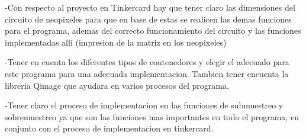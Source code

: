 \documentclass{article}
\begin{document}
-Con respecto al proyecto en Tinkercard hay que tener claro las dimensiones del circuito de neopixeles para que en base de estas se realicen las demas funciones para el programa, ademas del correcto funcionamiento del circuito y las funciones implementadas alli (impresion de la matriz en los neopixeles)

-Tener en cuenta los diferentes tipos de contenedores y elegir el adecuado para este programa para una adecuada implementacion. Tambien tener encuenta la libreria Qimage que ayudara en varios procesos del programa. 

-Tener claro el proceso de implementacion en las funciones de submuestreo y sobremuestreo ya que son las funciones mas importantes en todo el programa, en conjunto con el proceso de implementacion en tinkercard.
\end{document}
